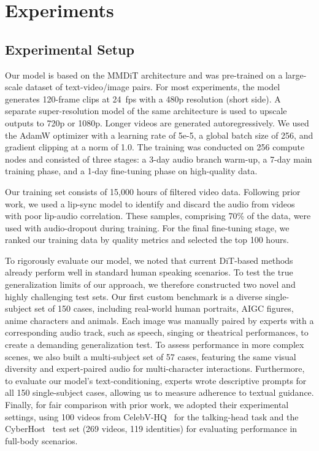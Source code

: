 \section{Experiments}\label{sec:exp}

\subsection{Experimental Setup}

Our model is based on the MMDiT architecture and was pre-trained on a large-scale dataset of text-video/image pairs. For most experiments, the model generates 120-frame clips at 24~fps with a 480p resolution (short side). A separate super-resolution model of the same architecture is used to upscale outputs to 720p or 1080p. Longer videos are generated autoregressively. We used the AdamW optimizer with a learning rate of 5e-5, a global batch size of 256, and gradient clipping at a norm of 1.0. The training was conducted on 256 compute nodes and consisted of three stages: a 3-day audio branch warm-up, a 7-day main training phase, and a 1-day fine-tuning phase on high-quality data.

Our training set consists of 15,000 hours of filtered video data. Following prior work, we used a lip-sync model to identify and discard the audio from videos with poor lip-audio correlation. These samples, comprising 70\% of the data, were used with audio-dropout during training. For the final fine-tuning stage, we ranked our training data by quality metrics and selected the top 100 hours.

To rigorously evaluate our model, we noted that current DiT-based methods already perform well in standard human speaking scenarios. To test the true generalization limits of our approach, we therefore constructed two novel and highly challenging test sets. Our first custom benchmark is a diverse single-subject set of 150 cases, including real-world human portraits, AIGC figures, anime characters and animals. Each image was manually paired by experts with a corresponding audio track, such as speech, singing or theatrical performances, to create a demanding generalization test. To assess performance in more complex scenes, we also built a multi-subject set of 57 cases, featuring the same visual diversity and expert-paired audio for multi-character interactions. Furthermore, to evaluate our model's text-conditioning, experts wrote descriptive prompts for all 150 single-subject cases, allowing us to measure adherence to textual guidance. Finally, for fair comparison with prior work, we adopted their experimental settings, using 100 videos from CelebV-HQ~\cite{zhu2022celebv} for the talking-head task and the CyberHost~\cite{lin2025cyberhost} test set (269 videos, 119 identities) for evaluating performance in full-body scenarios.


